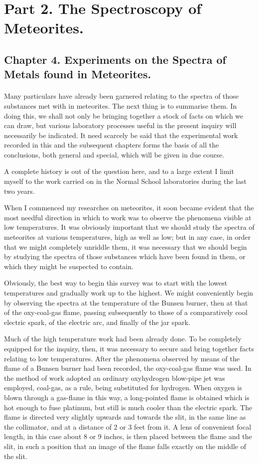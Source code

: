 \documentclass[a4paper, 12pt, oneside, polutonikogreek, english]{article}
\begin{document}
\section{Part 2. The Spectroscopy of Meteorites.}
\subsection{Chapter 4. Experiments on the Spectra of Metals found in Meteorites.}
\paragraph{}
Many particulars have already been garnered relating to the spectra of those substances met with in meteorites. The next thing is to summarise them. In doing this, we shall not only be bringing together a stock of facts on which we can draw, but various laboratory processes useful in the present inquiry will necessarily be indicated. It need scarcely be said that the experimental work recorded in this and the subsequent chapters forms the basis of all the conclusions, both general and special, which will be given in due course.

A complete history is out of the question here, and to a large extent I limit myself to the work carried on in the Normal School laboratories during the last two years.

When I commenced my researches on meteorites, it soon became evident that the most needful direction in which to work was to observe the phenomena visible at low temperatures. It was obviously important that we should study the spectra of meteorites at various temperatures, high as well as low; but in any case, in order that we might completely unriddle them, it was necessary that we should begin by studying the spectra of those substances which have been found in them, or which they might be suspected to contain.

Obviously, the best way to begin this survey was to start with the lowest temperatures and gradually work up to the highest. We might conveniently begin by observing the spectra at the temperature of the Bunsen burner, then at that of the oxy-coal-gas flame, passing subsequently to those of a comparatively cool electric spark, of the electric arc, and finally of the jar spark.

Much of the high temperature work had been already done. To be completely equipped for the inquiry, then, it was necessary to secure and bring together facts relating to low temperatures. After the phenomena observed by means of the flame of a Bunsen burner had been recorded, the oxy-coal-gas flame was used. In the method of work adopted an ordinary oxyhydrogen blow-pipe jet was employed, coal-gas, as a rule, being substituted for hydrogen. When oxygen is blown through a gas-flame in this way, a long-pointed flame is obtained which is hot enough to fuse platinum, but still is much cooler than the electric spark. The flame is directed very slightly upwards and towards the slit, in the same line as the collimator, and at a distance of 2 or 3 feet from it. A lens of convenient focal length, in this case about 8 or 9 inches, is then placed between the flame and the slit, in such a position that an image of the flame falls exactly on the middle of the slit.
\end{document}
